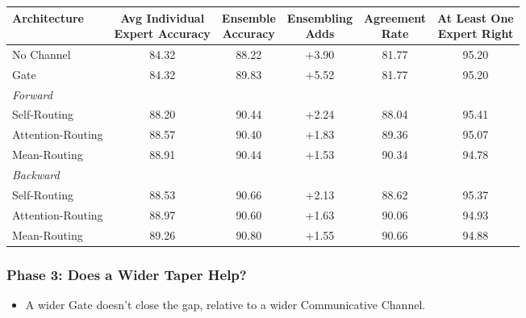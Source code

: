 \documentclass[11pt,a4paper]{article}
\newcommand{\tnote}[1]{\par\vspace{0.6ex}{\footnotesize #1}\par}
\newcommand{\panel}[1]{\multicolumn{1}{l}{\textit{#1}}}
\newcommand{\finding}[2][12]{\Needspace{#1\baselineskip}\subsubsection*{#2}}
\begin{document}
\begin{center}
\small
\begin{tabular}{@{}lccccc@{}}
\toprule
Architecture
& \shortstack{Avg Individual\\Expert Accuracy}
& \shortstack{Ensemble\\Accuracy}
& \shortstack{Ensembling\\Adds}
& \shortstack{Agreement\\Rate}
& \shortstack{At Least One\\Expert Right} \\
\midrule
No Channel & 84.32 & 88.22 & +3.90 & 81.77 & 95.20 \\
Gate       & 84.32 & 89.83 & +5.52 & 81.77 & 95.20 \\
\midrule
\panel{Forward} \\
\quad Self-Routing      & 88.20 & 90.44 & +2.24 & 88.04 & 95.41 \\
\quad Attention-Routing & 88.57 & 90.40 & +1.83 & 89.36 & 95.07 \\
\quad Mean-Routing      & 88.91 & 90.44 & +1.53 & 90.34 & 94.78 \\
\midrule
\panel{Backward} \\
\quad Self-Routing      & 88.53 & 90.66 & +2.13 & 88.62 & 95.37 \\
\quad Attention-Routing & 88.97 & 90.60 & +1.63 & 90.06 & 94.93 \\
\quad Mean-Routing      & 89.26 & 90.80 & +1.55 & 90.66 & 94.88 \\
\bottomrule
\end{tabular}
\tnote{All values in \%.}
\end{center}

\finding[12]{Phase 3: Does a Wider Taper Help?}

\begin{itemize}
  \item A wider Gate doesn't close the gap, relative to a wider Communicative Channel.
\end{itemize}
\end{document}
